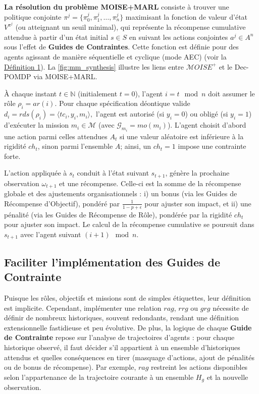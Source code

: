 \documentclass[francais,ROIA,Unicode,manuscript]{cedram}
\begin{document}
\textbf{La résolution du problème MOISE+MARL} consiste à trouver une politique conjointe
$
    \pi^j = \{\pi^j_0, \pi^j_1, \dots, \pi^j_n\}
$
maximisant la fonction de valeur d'état \(V^{\pi^j}\) (ou atteignant un seuil minimal), qui représente la récompense cumulative attendue à partir d'un état initial \(s \in S\) en suivant les actions conjointes \(a^j \in A^n\) sous l'effet de \textbf{Guides de Contraintes}. Cette fonction est définie pour des agents agissant de manière séquentielle et cyclique (mode AEC) (voir la \hyperref[eq:single_value_function]{Définition 1}). La \autoref{fig:mm_synthesis} illustre les liens entre \(\mathcal{M}OISE^+\) et le Dec-POMDP via MOISE+MARL.

À chaque instant \(t \in \mathbb{N}\) (initialement \(t=0\)), l'agent \(i = t \mod n\) doit assumer le rôle \(\rho_i = ar(i)\). Pour chaque spécification déontique valide
$
    d_i = rds(\rho_i) = \langle tc_i, y_i, m_i \rangle,
$
l'agent est autorisé (si \(y_i=0\)) ou obligé (si \(y_i=1\)) d'exécuter la mission \(m_i \in \mathcal{M}\) (avec \(\mathcal{G}_{m_i} = mo(m_i)\)). L'agent choisit d'abord une action parmi celles attendues \(A_t\) si une valeur aléatoire est inférieure à la rigidité \(ch_t\), sinon parmi l'ensemble \(A\); ainsi, un \(ch_t = 1\) impose une contrainte forte.

L'action appliquée à \(s_t\) conduit à l'état suivant \(s_{t+1}\), génère la prochaine observation \(\omega_{t+1}\) et une récompense. Celle-ci est la somme de la récompense globale et des ajustements organisationnels :
i) un bonus (via les Guides de Récompense d'Objectif), pondéré par \(\frac{1}{1-p+\epsilon}\) pour ajuster son impact, et
ii) une pénalité (via les Guides de Récompense de Rôle), pondérée par la rigidité \(ch_t\) pour ajuster son impact.
Le calcul de la récompense cumulative se poursuit dans \(s_{t+1}\) avec l'agent suivant \((i+1) \mod n\).

\subsection{Faciliter l'implémentation des \textbf{Guides de Contrainte}}

Puisque les rôles, objectifs et missions sont de simples étiquettes, leur définition est implicite. Cependant, implémenter une relation \(rag\), \(rrg\) ou \(grg\) nécessite de définir de nombreux historiques, souvent redondants, rendant une définition extensionnelle fastidieuse et peu évolutive. De plus, la logique de chaque \textbf{Guide de Contrainte} repose sur l’analyse de trajectoires d’agents : pour chaque historique observé, il faut décider s’il appartient à un ensemble d’historiques attendus et quelles conséquences en tirer (masquage d’actions, ajout de pénalités ou de bonus de récompense). Par exemple, \(rag\) restreint les actions disponibles selon l’appartenance de la trajectoire courante à un ensemble \(H_g\) et la nouvelle observation.
\end{document}

